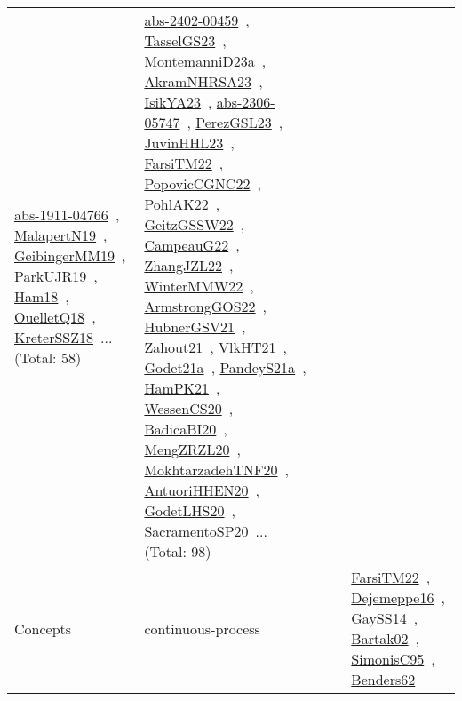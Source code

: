 {\begin{longtable}{lp{3cm}>{\raggedright\arraybackslash}p{6cm}>{\raggedright\arraybackslash}p{6cm}>{\raggedright\arraybackslash}p{8cm}}
\href{works/abs-1911-04766.pdf}{abs-1911-04766}~\cite{abs-1911-04766}, \href{works/MalapertN19.pdf}{MalapertN19}~\cite{MalapertN19}, \href{works/GeibingerMM19.pdf}{GeibingerMM19}~\cite{GeibingerMM19}, \href{works/ParkUJR19.pdf}{ParkUJR19}~\cite{ParkUJR19}, \href{works/Ham18.pdf}{Ham18}~\cite{Ham18}, \href{works/OuelletQ18.pdf}{OuelletQ18}~\cite{OuelletQ18}, \href{works/KreterSSZ18.pdf}{KreterSSZ18}~\cite{KreterSSZ18}... (Total: 58) & \href{works/abs-2402-00459.pdf}{abs-2402-00459}~\cite{abs-2402-00459}, \href{works/TasselGS23.pdf}{TasselGS23}~\cite{TasselGS23}, \href{works/MontemanniD23a.pdf}{MontemanniD23a}~\cite{MontemanniD23a}, \href{works/AkramNHRSA23.pdf}{AkramNHRSA23}~\cite{AkramNHRSA23}, \href{works/IsikYA23.pdf}{IsikYA23}~\cite{IsikYA23}, \href{works/abs-2306-05747.pdf}{abs-2306-05747}~\cite{abs-2306-05747}, \href{works/PerezGSL23.pdf}{PerezGSL23}~\cite{PerezGSL23}, \href{works/JuvinHHL23.pdf}{JuvinHHL23}~\cite{JuvinHHL23}, \href{works/FarsiTM22.pdf}{FarsiTM22}~\cite{FarsiTM22}, \href{works/PopovicCGNC22.pdf}{PopovicCGNC22}~\cite{PopovicCGNC22}, \href{works/PohlAK22.pdf}{PohlAK22}~\cite{PohlAK22}, \href{works/GeitzGSSW22.pdf}{GeitzGSSW22}~\cite{GeitzGSSW22}, \href{works/CampeauG22.pdf}{CampeauG22}~\cite{CampeauG22}, \href{works/ZhangJZL22.pdf}{ZhangJZL22}~\cite{ZhangJZL22}, \href{works/WinterMMW22.pdf}{WinterMMW22}~\cite{WinterMMW22}, \href{works/ArmstrongGOS22.pdf}{ArmstrongGOS22}~\cite{ArmstrongGOS22}, \href{works/HubnerGSV21.pdf}{HubnerGSV21}~\cite{HubnerGSV21}, \href{works/Zahout21.pdf}{Zahout21}~\cite{Zahout21}, \href{works/VlkHT21.pdf}{VlkHT21}~\cite{VlkHT21}, \href{works/Godet21a.pdf}{Godet21a}~\cite{Godet21a}, \href{works/PandeyS21a.pdf}{PandeyS21a}~\cite{PandeyS21a}, \href{works/HamPK21.pdf}{HamPK21}~\cite{HamPK21}, \href{works/WessenCS20.pdf}{WessenCS20}~\cite{WessenCS20}, \href{works/BadicaBI20.pdf}{BadicaBI20}~\cite{BadicaBI20}, \href{works/MengZRZL20.pdf}{MengZRZL20}~\cite{MengZRZL20}, \href{works/MokhtarzadehTNF20.pdf}{MokhtarzadehTNF20}~\cite{MokhtarzadehTNF20}, \href{works/AntuoriHHEN20.pdf}{AntuoriHHEN20}~\cite{AntuoriHHEN20}, \href{works/GodetLHS20.pdf}{GodetLHS20}~\cite{GodetLHS20}, \href{works/SacramentoSP20.pdf}{SacramentoSP20}~\cite{SacramentoSP20}... (Total: 98)\\
Concepts & continuous-process &  &  & \href{works/FarsiTM22.pdf}{FarsiTM22}~\cite{FarsiTM22}, \href{works/Dejemeppe16.pdf}{Dejemeppe16}~\cite{Dejemeppe16}, \href{works/GaySS14.pdf}{GaySS14}~\cite{GaySS14}, \href{works/Bartak02.pdf}{Bartak02}~\cite{Bartak02}, \href{works/SimonisC95.pdf}{SimonisC95}~\cite{SimonisC95}, \href{works/Benders62.pdf}{Benders62}~\cite{Benders62}\\

\end{longtable}}
